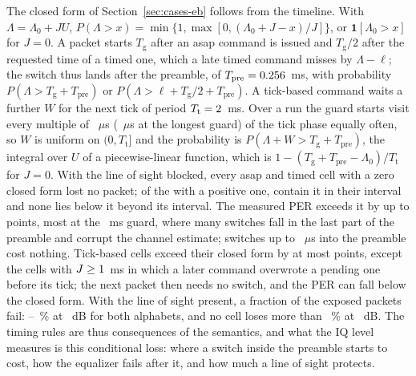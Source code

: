 The closed form of Section~\ref{sec:cases-eb} follows from the timeline. With
$\Lambda=\Lambda_0+JU$, $P(\Lambda>x)=\min\{1,\max[0,(\Lambda_0+J-x)/J]\}$, or
$\mathbf{1}[\Lambda_0>x]$ for $J=0$. A packet starts $T_{\mathrm{g}}$ after an asap command is
issued and $T_{\mathrm{g}}/2$ after the requested time of a timed one, which a late timed command
misses by $\Lambda-\ell$; the switch thus lands after the preamble, of
$T_{\mathrm{pre}}=0.256$~ms, with probability $P(\Lambda>T_{\mathrm{g}}+T_{\mathrm{pre}})$
or $P(\Lambda>\ell+T_{\mathrm{g}}/2+T_{\mathrm{pre}})$. A tick-based command waits a further
$W$ for the next tick of period $T_{\mathrm{t}}=2$~ms. Over a run the guard starts
visit every multiple of \numEbTickPhaseMinUs~$\mu$s (\numEbTickPhaseMaxUs~$\mu$s at the longest
guard) of the tick phase equally often, so $W$ is uniform on $(0,T_{\mathrm{t}}]$ and the
probability is $P(\Lambda+W>T_{\mathrm{g}}+T_{\mathrm{pre}})$, the integral over $U$ of a
piecewise-linear function, which is $1-(T_{\mathrm{g}}+T_{\mathrm{pre}}-\Lambda_0)/T_{\mathrm{t}}$
for $J=0$. With the line of sight blocked, every asap and timed cell with a zero closed form lost
no packet; of the \numEbCfCellsPos{} with a positive one, \numEbCfCellsInCi{} contain it in
their interval and none lies below it beyond its interval. The measured PER exceeds it by up to
\numEbCfMaxExcessPts{} points, most at the \numEbGuardShortMs~ms guard, where many switches fall
in the last part of the preamble and corrupt the channel estimate; switches up to
\numEbPreSafeUs~$\mu$s into the preamble cost nothing. Tick-based cells exceed their closed form
by at most \numEbCfTickExcessPts{} points, except the \numEbTickOverwriteCells{} cells with
$J\ge1$~ms in which a later command overwrote a pending one before its tick;
the next packet then needs no switch, and the PER can fall below the closed form. With the line
of sight present, a fraction of the exposed packets fail:
\numEbLosLoExposedMinPct--\numEbLosLoExposedMaxPct~\% at \numEbArcEsnoLowDb~dB for both
alphabets, and no cell loses more
than \numEbLosHiPerMaxPct~\% at \numEbEsnoDb~dB. The timing rules are thus consequences of the
semantics, and what the IQ level measures is this conditional loss: where a switch inside the
preamble starts to cost, how the equalizer fails after it, and how much a line of sight
protects.

